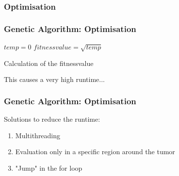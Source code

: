 \documentclass{beamer}
\begin{document}
 
 \subsubsection{Optimisation}
 \begin{frame}
 \frametitle{Genetic Algorithm: Optimisation}
 \begin{algorithm}[H]
 $temp=0$\;
 $fitnessvalue = \sqrt{temp}$\;
 \;
 \caption{Calculation of the fitnessvalue}
\end{algorithm}
This causes a very high runtime...
 \end{frame}
 
 \begin{frame}
 \frametitle{Genetic Algorithm: Optimisation}
 Solutions to reduce the runtime:
 \begin{enumerate}
 \item Multithreading
 \item Evaluation only in a specific region around the tumor
 \item "Jump" in the for loop
 \end{enumerate}
 
 \end{frame}
 
 
 
 
 
 
\end{document}
